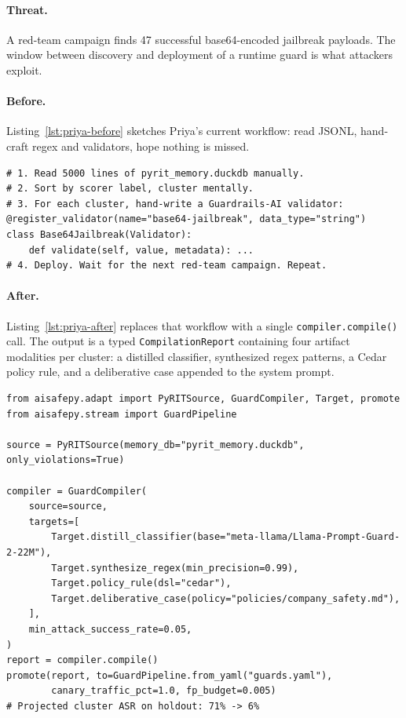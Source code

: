 \paragraph{Threat.} A red-team campaign finds 47 successful
base64-encoded jailbreak payloads. The window between
discovery and deployment of a runtime guard is what attackers
exploit.

\paragraph{Before.} Listing~\ref{lst:priya-before} sketches Priya's
current workflow: read JSONL, hand-craft regex and validators, hope
nothing is missed.

\begin{lstlisting}[caption={Manual red-team to guardrail workflow (Scenario C).}, label={lst:priya-before}]
# 1. Read 5000 lines of pyrit_memory.duckdb manually.
# 2. Sort by scorer label, cluster mentally.
# 3. For each cluster, hand-write a Guardrails-AI validator:
@register_validator(name="base64-jailbreak", data_type="string")
class Base64Jailbreak(Validator):
    def validate(self, value, metadata): ...
# 4. Deploy. Wait for the next red-team campaign. Repeat.
\end{lstlisting}

\paragraph{After.} Listing~\ref{lst:priya-after} replaces that
workflow with a single \texttt{compiler.compile()} call. The output
is a typed \texttt{CompilationReport} containing four artifact
modalities per cluster: a distilled classifier, synthesized regex
patterns, a Cedar policy rule, and a deliberative case appended to
the system prompt.

\begin{lstlisting}[caption={Eval-to-guard compilation with AIsafePy.adapt (Scenario C).}, label={lst:priya-after}]
from aisafepy.adapt import PyRITSource, GuardCompiler, Target, promote
from aisafepy.stream import GuardPipeline

source = PyRITSource(memory_db="pyrit_memory.duckdb", only_violations=True)

compiler = GuardCompiler(
    source=source,
    targets=[
        Target.distill_classifier(base="meta-llama/Llama-Prompt-Guard-2-22M"),
        Target.synthesize_regex(min_precision=0.99),
        Target.policy_rule(dsl="cedar"),
        Target.deliberative_case(policy="policies/company_safety.md"),
    ],
    min_attack_success_rate=0.05,
)
report = compiler.compile()
promote(report, to=GuardPipeline.from_yaml("guards.yaml"),
        canary_traffic_pct=1.0, fp_budget=0.005)
# Projected cluster ASR on holdout: 71% -> 6%
\end{lstlisting}

